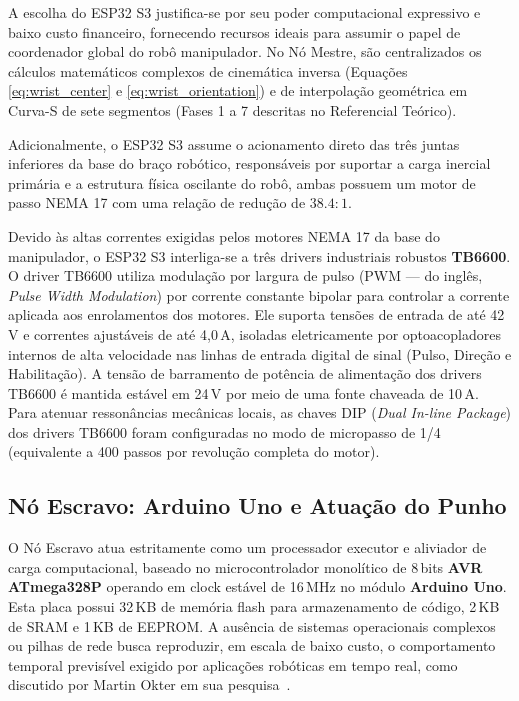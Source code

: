 A escolha do ESP32 S3 justifica-se por seu poder computacional expressivo e baixo custo financeiro, fornecendo recursos ideais para assumir o papel de coordenador global do robô manipulador. No Nó Mestre, são centralizados os cálculos matemáticos complexos de cinemática inversa (Equações \ref{eq:wrist_center} e \ref{eq:wrist_orientation}) e de interpolação geométrica em Curva-S de sete segmentos (Fases 1 a 7 descritas no Referencial Teórico).

Adicionalmente, o ESP32 S3 assume o acionamento direto das três juntas inferiores da base do braço robótico, responsáveis por suportar a carga inercial primária e a estrutura física oscilante do robô, ambas possuem um motor de passo NEMA 17 com uma relação de redução de $38.4:1$.

Devido às altas correntes exigidas pelos motores NEMA 17 da base do manipulador, o ESP32 S3 interliga-se a três drivers industriais robustos \textbf{TB6600}. O driver TB6600 utiliza modulação por largura de pulso (PWM --- do inglês, \textit{Pulse Width Modulation}) por corrente constante bipolar para controlar a corrente aplicada aos enrolamentos dos motores. Ele suporta tensões de entrada de até 42\,V e correntes ajustáveis de até 4{,}0\,A, isoladas eletricamente por optoacopladores internos de alta velocidade nas linhas de entrada digital de sinal (Pulso, Direção e Habilitação). A tensão de barramento de potência de alimentação dos drivers TB6600 é mantida estável em 24\,V por meio de uma fonte chaveada de 10\,A. Para atenuar ressonâncias mecânicas locais, as chaves DIP (\textit{Dual In-line Package}) dos drivers TB6600 foram configuradas no modo de micropasso de 1/4 (equivalente a 400 passos por revolução completa do motor).

\subsection{Nó Escravo: Arduino Uno e Atuação do Punho}
\label{subsec:no_escravo}

O Nó Escravo atua estritamente como um processador executor e aliviador de carga computacional, baseado no microcontrolador monolítico de 8\,bits \textbf{AVR ATmega328P} operando em clock estável de 16\,MHz no módulo \textbf{Arduino Uno}. Esta placa possui 32\,KB de memória flash para armazenamento de código, 2\,KB de SRAM e 1\,KB de EEPROM. A ausência de sistemas operacionais complexos ou pilhas de rede busca reproduzir, em escala de baixo custo, o comportamento temporal previsível exigido por aplicações robóticas em tempo real, como discutido por Martin Okter em sua pesquisa~\cite{okter2025ros}.

